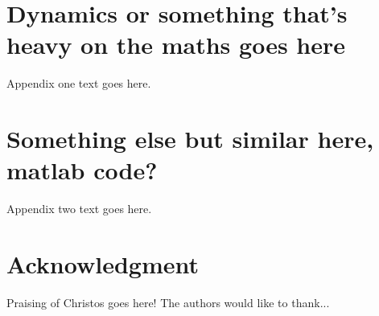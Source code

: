 \documentclass[journal]{IEEEtran}
\begin{document}
%


\appendices
\section{Dynamics or something that's heavy on the maths goes here}
Appendix one text goes here.

\section{Something else but similar here, matlab code?}
Appendix two text goes here.


\section*{Acknowledgment}

Praising of Christos goes here!
The authors would like to thank...


\ifCLASSOPTIONcaptionsoff
  \newpage
\fi




\end{document}
